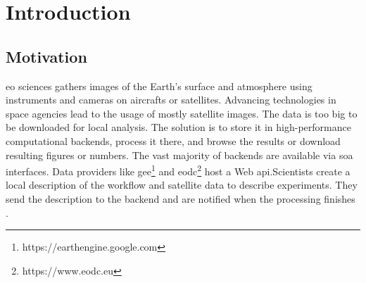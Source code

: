 \documentclass[draft,final]{vutinfth} %
\begin{document}

\tableofcontents %

\mainmatter

\chapter{Introduction}\label{Introduction}


\section{Motivation}\label{Motivation}\label{Use Cases}
\gls{eo} sciences gathers images of the Earth's surface and atmosphere using instruments and cameras on aircrafts or satellites. Advancing technologies in space agencies lead to the usage of mostly satellite images. The data is too big to be downloaded for local analysis. The solution is to store it in high-performance computational backends, process it there, and browse the results or download resulting figures or numbers. The vast majority of backends are available via \gls{soa} interfaces. Data providers like \gls{gee}\footnote{https://earthengine.google.com} and \gls{eodc}\footnote{https://www.eodc.eu} host a Web \gls{api}.Scientists create a local description of the workflow and satellite data to describe experiments. They send the description to the backend and are notified when the processing finishes \cite{geocloud}. 
\end{document}
